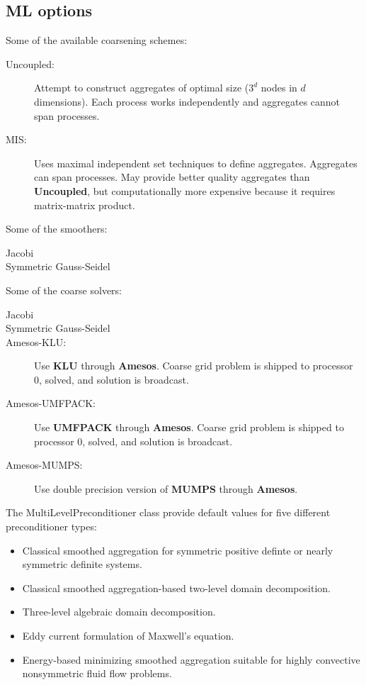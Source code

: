 \subsection{ML options}
Some of the available coarsening schemes:
\begin{description}
  \item[Uncoupled:] Attempt to construct aggregates of optimal size ($3^d$
    nodes in $d$ dimensions). Each process works independently and aggregates
    cannot span processes.
  \item[MIS:] Uses maximal independent set techniques to define aggregates.
    Aggregates can span processes. May provide better quality aggregates than
    {\bf Uncoupled}, but computationally more expensive because it requires
    matrix-matrix product.
\end{description}
Some of the smoothers:
\begin{description}
  \item[Jacobi]
  \item[Symmetric Gauss-Seidel]
\end{description}
Some of the coarse solvers:
\begin{description}
  \item[Jacobi]
  \item[Symmetric Gauss-Seidel]
  \item[Amesos-KLU:] Use {\bf KLU} through {\bf Amesos}. Coarse grid problem
    is shipped to processor 0, solved, and solution is broadcast.
  \item[Amesos-UMFPACK:] Use {\bf UMFPACK} through {\bf Amesos}. Coarse grid
    problem is shipped to processor 0, solved, and solution is broadcast.
  \item[Amesos-MUMPS:] Use double precision version of {\bf MUMPS} through
    {\bf Amesos}.
\end{description}
The MultiLevelPreconditioner class provide default values for five different
preconditioner types:
\begin{itemize}
  \item Classical smoothed aggregation for symmetric positive definte or
    nearly symmetric definite systems.
  \item Classical smoothed aggregation-based two-level domain decomposition.
  \item Three-level algebraic domain decomposition.
  \item Eddy current formulation of Maxwell's equation.
  \item Energy-based minimizing smoothed aggregation suitable for highly
    convective nonsymmetric fluid flow problems.
\end{itemize}
